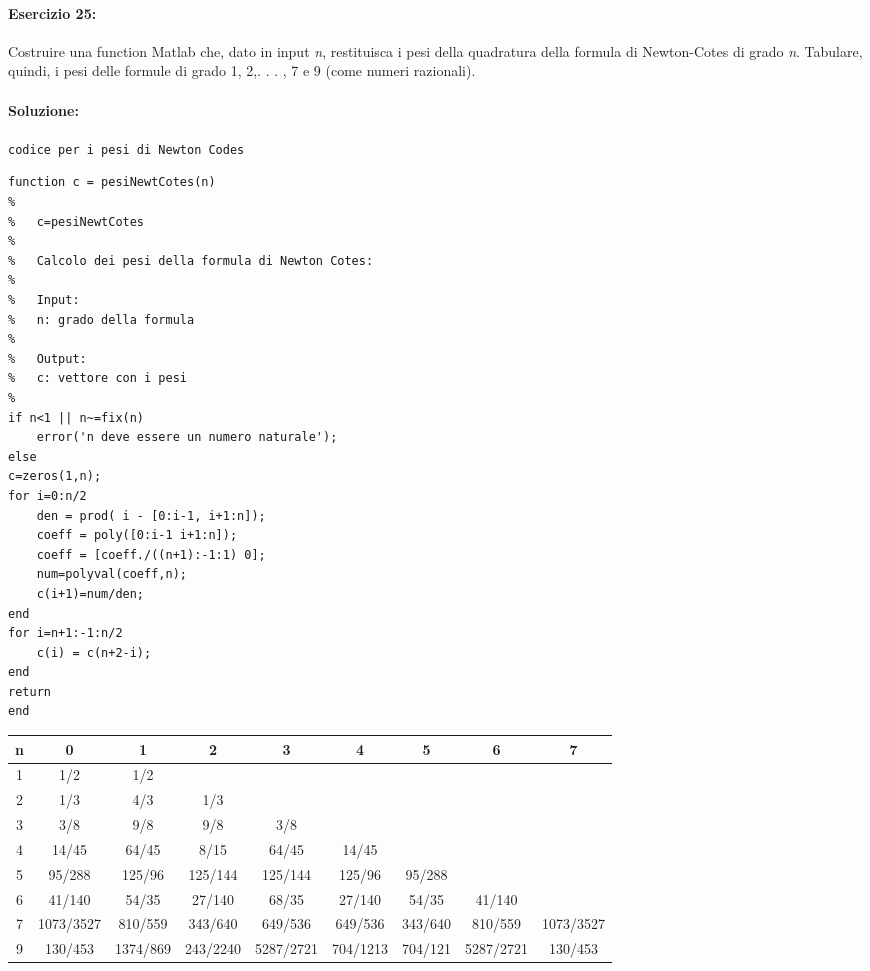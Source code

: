 \documentclass[12pt]{article}
\begin{document}
\paragraph{Esercizio 25:}
Costruire una function Matlab che, dato in input \emph{n}, restituisca i pesi della quadratura della formula di Newton-Cotes di grado \emph{n}. Tabulare, quindi, i pesi delle formule di grado
1, 2,. . . , 7 e 9 (come numeri razionali).


\paragraph{Soluzione:}

\texttt{codice per i pesi di Newton Codes}
\begin{lstlisting}[frame=single]
function c = pesiNewtCotes(n)
%
%   c=pesiNewtCotes
%
%   Calcolo dei pesi della formula di Newton Cotes:
%
%   Input:
%   n: grado della formula
%
%   Output:
%   c: vettore con i pesi
%
if n<1 || n~=fix(n)
    error('n deve essere un numero naturale');
else
c=zeros(1,n);
for i=0:n/2
    den = prod( i - [0:i-1, i+1:n]);
    coeff = poly([0:i-1 i+1:n]);
    coeff = [coeff./((n+1):-1:1) 0];
    num=polyval(coeff,n);
    c(i+1)=num/den;
end
for i=n+1:-1:n/2
    c(i) = c(n+2-i);
end
return
end
\end{lstlisting}


\begin{center}
\begin{adjustbox}{width=\textwidth}
\begin{tabular}{||c || c | c | c | c | c | c | c | c ||} 
     \hline
     
     n & 0 & 1 & 2 & 3 & 4 & 5 & 6 & 7\\
     \hline\hline
     1 & 1/2 & 1/2 & & & & & & \\ 
     \hline
     2 & 1/3 & 4/3 & 1/3 & & & & & \\
     \hline
     3 & 3/8 & 9/8 & 9/8 & 3/8 & & & & \\
     \hline
     4 & 14/45 & 64/45 & 8/15 & 64/45 & 14/45 & & & \\
     \hline
     5 & 95/288 & 125/96 & 125/144 & 125/144 & 125/96 & 95/288 & & \\ 
     \hline
     6 & 41/140 & 54/35 & 27/140 & 68/35 & 27/140 & 54/35 & 41/140 & \\  
     \hline
     7 & 1073/3527 & 810/559 & 343/640 & 649/536 & 649/536 & 343/640 & 810/559 & 1073/3527\\  
     \hline
     9 & 130/453 & 1374/869 & 243/2240 & 5287/2721 & 704/1213 & 704/121 & 5287/2721 & 130/453\\
     \hline
\end{tabular}
\end{adjustbox}
\end{center}
\end{document}
